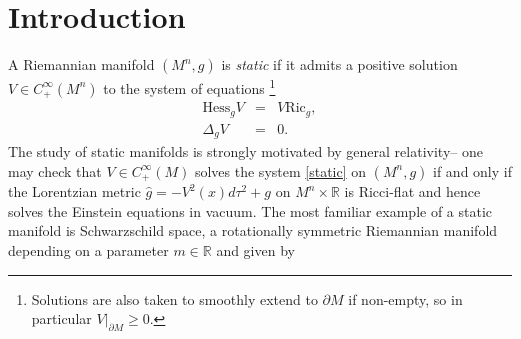 \documentclass[12pt,twoside]{article}
\theoremstyle{plain}
\theoremstyle{definition}
\theoremstyle{remark}
\numberwithin{equation}{section}
\begin{document}


\section{Introduction}
A Riemannian manifold $(M^{n},g)$ is \textit{static} if it admits a positive solution $V \in C^{\infty}_{+}(M^{n})$ to the system of equations \footnote{Solutions are also taken to smoothly extend to $\partial M$ if non-empty, so in particular $V|_{\partial M} \geq 0$.}
\begin{eqnarray}
    \text{Hess}_{g} V &=& V \text{Ric}_{g}, \label{static} \\
    \Delta_{g} V &=& 0. \nonumber
\end{eqnarray}
 The study of static manifolds is strongly motivated by general relativity-- one may check that $V \in C^{\infty}_{+}(M)$ solves the system \eqref{static} on $(M^{n},g)$ if and only if the Lorentzian metric $\widehat{g}=-V^{2}(x)d\tau^{2} + g$ on $M^{n} \times \mathbb{R}$ is Ricci-flat and hence solves the Einstein equations in vacuum. The most familiar example of a static manifold is Schwarzschild space, a rotationally symmetric Riemannian manifold depending on a parameter $m \in \mathbb{R}$ and given by %
\end{document}
